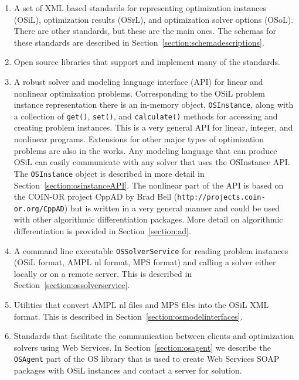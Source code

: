 \documentclass[11pt]{article}
\renewcommand{\_}{{\char"5F}}
\renewcommand{\{}{{\char"7B}}
\renewcommand{\}}{{\char"7D}}
\renewcommand{\^}{{\char"0D}}
\renewcommand{\'}{{\char"0D}}
\newcommand{\UrlCppad}{http://projects.coin-or.org/CppAD}
\begin{document}
\begin{enumerate}
\item{}  A set of XML based standards for representing optimization instances (OSiL), 
optimization results (OSrL), and optimization solver options (OSoL). 
There are other standards, but these are the main ones. 
The schemas for these standards are described in Section~\ref{section:schemadescriptions}.


\item{}  Open source libraries  that support and implement many of the standards.

\item{}  A robust solver and modeling language interface (API) for linear and nonlinear optimization problems.
Corresponding to the OSiL problem instance representation there is an in-memory object,
{\tt OSInstance},
along with a collection of  {\tt get()},   {\tt set()}, and {\tt calculate()} methods for accessing and creating
problem instances. This is a very general API for linear, integer, and nonlinear programs.
Extensions for other major types of optimization problems are also in the works. Any modeling language that can
produce OSiL can easily communicate with any solver that uses the OSInstance API.   
The {\tt OSInstance} object
is described in more detail in Section~\ref{section:osinstanceAPI}. The nonlinear part of the API is based on the
COIN-OR project CppAD by Brad Bell ({\tt\UrlCppad}) but is written 
in a very general manner and could be used with other algorithmic differentiation packages. More detail on 
algorithmic differentiation is provided in Section~\ref{section:ad}.


\item{}  A  command line executable {\tt OSSolverService}  for reading
problem instances (OSiL format, AMPL  nl format,  
MPS format) and calling a solver either locally or on a remote server.
This is described in Section~\ref{section:ossolverservice}.


\item{} Utilities that convert AMPL nl files  and MPS files into the OSiL XML format.
This is described in Section~\ref{section:osmodelinterfaces}.


\item{}  Standards that facilitate the communication between clients and optimization solvers using Web Services.
In  Section~\ref{section:osagent} we describe the {\tt OSAgent} part of the OS library
that is used to create Web Services SOAP packages with OSiL instances and contact a server for 
solution.


\end{enumerate}
\end{document}

